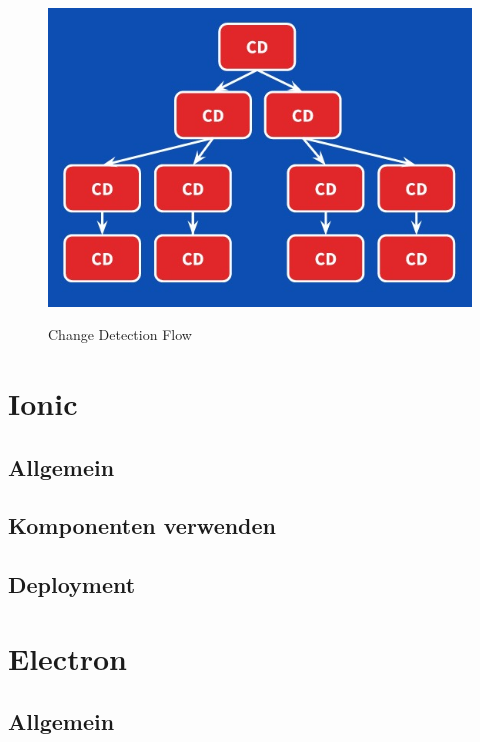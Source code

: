 \begin{figure}[ht]
 \centering
 \includegraphics[width=0.7\linewidth]{kapitel3/cd-tree.jpg}
 \caption{Change Detection Flow}\cite{changedetection-explained}
\end{figure}


\section{Ionic}
\subsection{Allgemein}
\subsection{Komponenten verwenden}
\subsection{Deployment}

\section{Electron}
\subsection{Allgemein}
